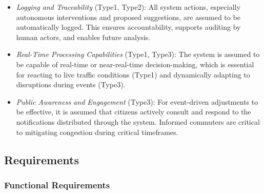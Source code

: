 \documentclass[a4paper,12pt]{article}
\begin{document}
\begin{itemize}
    \item \textit{Logging and Traceability} (Type1, Type2): All system actions, especially autonomous interventions and proposed suggestions, are assumed to be automatically logged. This ensures accountability, supports auditing by human actors, and enables future analysis.

    \item \textit{Real-Time Processing Capabilities} (Type1, Type3): The system is assumed to be capable of real-time or near-real-time decision-making, which is essential for reacting to live traffic conditions (Type1) and dynamically adapting to disruptions during events (Type3).

    \item \textit{Public Awareness and Engagement} (Type3): For event-driven adjustments to be effective, it is assumed that citizens actively consult and respond to the notifications distributed through the system. Informed commuters are critical to mitigating congestion during critical timeframes.
    
\end{itemize}

\newpage

\subsection{Requirements}

\subsubsection{Functional Requirements}
\end{document}
